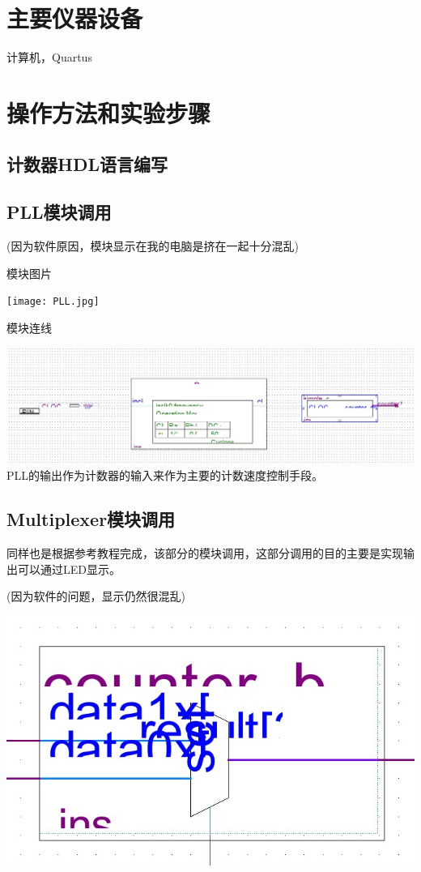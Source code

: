 \documentclass{zjureport}
\begin{document}
\section{主要仪器设备}
  计算机，Quartus

\section{操作方法和实验步骤}
  \subsection{计数器HDL语言编写}
    
  \subsection{PLL模块调用}
    (因为软件原因，模块显示在我的电脑是挤在一起十分混乱)
    \begin{clause}
      \item 模块图片
      \begin{center}
        \texttt{[image: PLL.jpg]}
      \end{center}
      \item 模块连线 
      \begin{center}
        \includegraphics[width=0.6\linewidth]{figures/Link_1.jpg}
        \\PLL的输出作为计数器的输入来作为主要的计数速度控制手段。
      \end{center}
    \end{clause}
  \subsection{Multiplexer模块调用}
    同样也是根据参考教程完成，该部分的模块调用，这部分调用的目的主要是实现输出可以通过LED显示。

    (因为软件的问题，显示仍然很混乱)
    \begin{center}
      \includegraphics[width=0.6\linewidth]{figures/Mux.jpg}
    \end{center}
    
\end{document}
